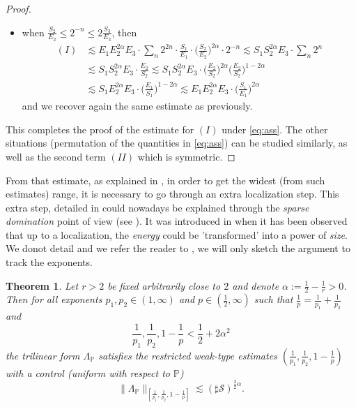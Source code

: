 \documentclass[a4paper,11pt,oneside]{amsart}
\newcommand{\PP}{\mathbb{P}}
\theoremstyle{plain}
\newtheorem{theorem}{Theorem}[section]
\theoremstyle{definition}
\begin{document}
\begin{proof}
\begin{itemize}
\item when $\frac{S_2}{E_2} \leq 2^{-n} \leq 2\frac{S_3}{E_3}$, then
\begin{align*}
 (I) & \lesssim E_1 E_2^{2\alpha} E_3 \cdot \sum_{n}  2^{2n} \cdot \frac{S_1}{E_1} \cdot \big(\frac{S_2}{E_2}\big)^{2\alpha} \cdot 2^{-n} \lesssim S_1 S_2^{2\alpha} E_3 \cdot \sum_{n}  2^{n} \\
 & \lesssim S_1 S_2^{2\alpha} E_3 \cdot \frac{E_2}{S_2} \lesssim S_1 S_2^{2\alpha} E_3 \cdot \big(\frac{E_2}{S_2}\big)^{2\alpha}\big(\frac{E_2}{S_2}\big)^{1-2\alpha}  \\
  & \lesssim S_1 E_2^{2\alpha} E_3 \cdot \big(\frac{E_1}{S_1}\big)^{1-2\alpha} \lesssim E_1 E_2^{2\alpha} E_3 \cdot \big(\frac{S_1}{E_1}\big)^{2\alpha}
   \end{align*}
and we recover again the same estimate as previously.
\end{itemize}

This completes the proof of the estimate for $(I)$ under \eqref{eq:ass}. The other situations (permutation of the quantities in \eqref{eq:ass}) can be studied similarly, as well as the second term $(II)$ which is symmetric.
\end{proof}

From that estimate, as explained in \cite[Sections 5 and 6]{BB}, in order to get the widest (from such estimates) range, it is necessary to go through an extra localization step. This extra step, detailed in \cite{BB} could nowadays be explained through the {\it sparse domination} point of view (see \cite{BeneaMuscaluSparse}). It was introduced in \cite{BeneaMuscalu} when it has been observed that up to a localization, the {\it energy} could be 'transformed' into a power of {\it size}. We donot detail and we refer the reader to \cite{BB}, we will only sketch the argument to track the exponents.

\bigskip

\begin{theorem} Let $r>2$ be fixed arbitrarily close to $2$ and denote $\alpha:=\frac{1}{2}-\frac{1}{r}>0$. Then for all exponents $p_1,p_2 \in(1,\infty)$ and $p\in(\frac{1}{2},\infty)$ such that $\frac{1}{p}=\frac{1}{p_1}+\frac{1}{p_2}$ and 
$$ \frac{1}{p_1},\frac{1}{p_2},1-\frac{1}{p} < \frac{1}{2}+2\alpha^2$$ the trilinear form $\Lambda_{\PP}$ satisfies the restricted weak-type estimates $(\frac{1}{p_1},\frac{1}{p_2},1-\frac{1}{p})$ with a control (uniform with respect to $\PP$)
$$ \|\Lambda_{\PP}\|_{[\frac{1}{p_1},\frac{1}{p_2},1-\frac{1}{p}]} \lesssim (\sharp {\mathcal S})^{\frac{3}{2} \alpha}.$$
\end{theorem}
\end{document}
